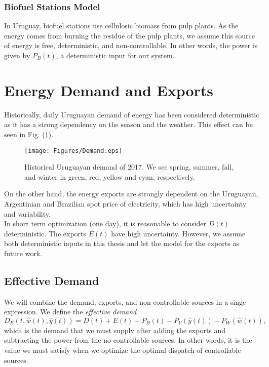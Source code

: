 \subsubsection{Biofuel Stations Model}

In Uruguay, biofuel stations use cellulosic biomass from pulp plants. As the energy comes from burning the residue of the pulp plants, we assume this source of energy is free, deterministic, and non-controllable. In other words, the power is given by $P_B(t)$, a deterministic input for our system.

\section{Energy Demand and Exports}

Historically, daily Uruguayan demand of energy has been considered deterministic as it has a strong dependency on the season and the weather. This effect can be seen in Fig. (\ref{Uy_Demand}). 
 \begin{figure}[H]
\centering
\texttt{[image: Figures/Demand.eps]}
\caption{Historical Uruguayan demand of 2017. We see spring, summer, fall, and winter in green, red, yellow and cyan, respectively.}
\label{Uy_Demand}
\end{figure}
On the other hand, the energy exports are strongly dependent on the Uruguayan, Argentinian and Brazilian spot price of electricity, which has high uncertainty and variability.\\
In short term optimization (one day), it is reasonable to consider $D(t)$ deterministic. The exports $E(t)$ have high uncertainty. However, we assume both deterministic inputs in this thesis and let the model for the exports as future work.

\subsection{Effective Demand} \label{Subsection_ED}

We will combine the demand, exports, and non-controllable sources in a singe expression. We define the \textit{effective demand}
\begin{equation}
D_E(t,\hat{w}(t),\hat{y}(t))=D(t)+E(t)-P_B(t)-P_Y(\hat{y}(t))-P_W(\hat{w}(t)),
\end{equation}
which is the demand that we must supply after adding the exports and subtracting the power from the no-controllable sources. In other words, it is the value we must satisfy when we optimize the optimal dispatch of controllable sources.

